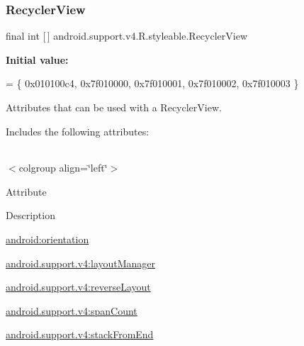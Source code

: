\subsubsection{\texorpdfstring{Recycler\+View}{RecyclerView}}
{\footnotesize\ttfamily final int \mbox{[}$\,$\mbox{]} android.\+support.\+v4.\+R.\+styleable.\+Recycler\+View\hspace{0.3cm}{\ttfamily [static]}}

{\bfseries Initial value\+:}
\begin{DoxyCode}
= \{
            0x010100c4, 0x7f010000, 0x7f010001, 0x7f010002,
            0x7f010003
        \}
\end{DoxyCode}
Attributes that can be used with a Recycler\+View. 

Includes the following attributes\+:

\tabulinesep=1mm
\begin{longtabu} spread 0pt [c]{*{0}{|X[-1]}|}
\hline
\end{longtabu}
$<$colgroup align=\char`\"{}left\char`\"{}$>$ 

Attribute

Description 

{\ttfamily \hyperlink{classandroid_1_1support_1_1v4_1_1R_1_1styleable_a45d2052c430de024aae5de8cf614d894}{android\+:orientation}}

{\ttfamily \hyperlink{classandroid_1_1support_1_1v4_1_1R_1_1styleable_ab6b6c3ab74ca094457a85f1e6996a730}{android.\+support.\+v4\+:layout\+Manager}}

{\ttfamily \hyperlink{classandroid_1_1support_1_1v4_1_1R_1_1styleable_a0af7d1bacde2568fa5bbd69fe6f3261e}{android.\+support.\+v4\+:reverse\+Layout}}

{\ttfamily \hyperlink{classandroid_1_1support_1_1v4_1_1R_1_1styleable_a2fc5b4b990851afc287e7ab8f60f18f8}{android.\+support.\+v4\+:span\+Count}}

{\ttfamily \hyperlink{classandroid_1_1support_1_1v4_1_1R_1_1styleable_ab104a582751ed1c1f7370efc87b2d64b}{android.\+support.\+v4\+:stack\+From\+End}}

